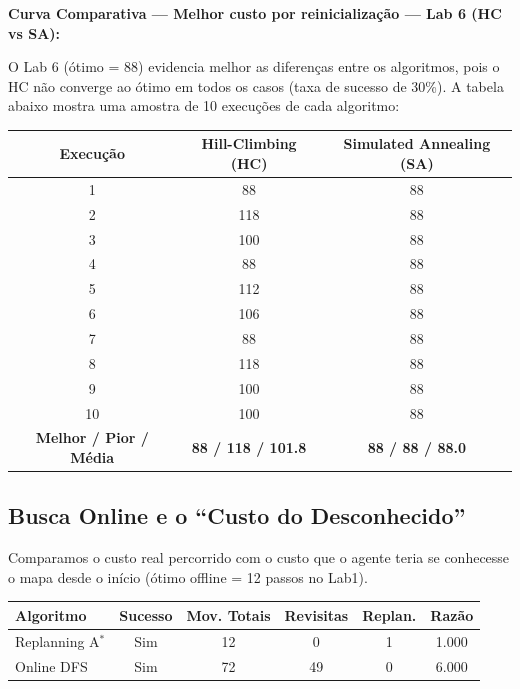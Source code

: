 \documentclass[12pt,a4paper]{article}
\begin{document}
\textbf{Curva Comparativa — Melhor custo por reinicialização — Lab 6 (HC vs SA):}

O Lab 6 (ótimo = 88) evidencia melhor as diferenças entre os algoritmos, pois o HC não converge ao ótimo em todos os casos (taxa de sucesso de 30\%). A tabela abaixo mostra uma amostra de 10 execuções de cada algoritmo:

\begin{table}[H]
\centering
\begin{tabular}{ccc}
\toprule
\textbf{Execução} & \textbf{Hill-Climbing (HC)} & \textbf{Simulated Annealing (SA)} \\
\midrule
1  & 88  & 88 \\
2  & 118 & 88 \\
3  & 100 & 88 \\
4  & 88  & 88 \\
5  & 112 & 88 \\
6  & 106 & 88 \\
7  & 88  & 88 \\
8  & 118 & 88 \\
9  & 100 & 88 \\
10 & 100 & 88 \\
\midrule
\textbf{Melhor / Pior / Média} & \textbf{88 / 118 / 101.8} & \textbf{88 / 88 / 88.0} \\
\bottomrule
\end{tabular}
\end{table}

\subsection{Busca Online e o ``Custo do Desconhecido''}
Comparamos o custo real percorrido com o custo que o agente teria se conhecesse o mapa desde o início (ótimo offline = 12 passos no Lab1).

\begin{table}[H]
\centering
\begin{tabular}{lccccc}
\toprule
\textbf{Algoritmo} & \textbf{Sucesso} & \textbf{Mov. Totais} & \textbf{Revisitas} & \textbf{Replan.} & \textbf{Razão} \\
\midrule
Replanning A$^*$ & Sim & 12 & 0 & 1 & 1.000 \\
Online DFS       & Sim & 72 & 49 & 0 & 6.000 \\
\bottomrule
\end{tabular}
\end{table}
\end{document}
